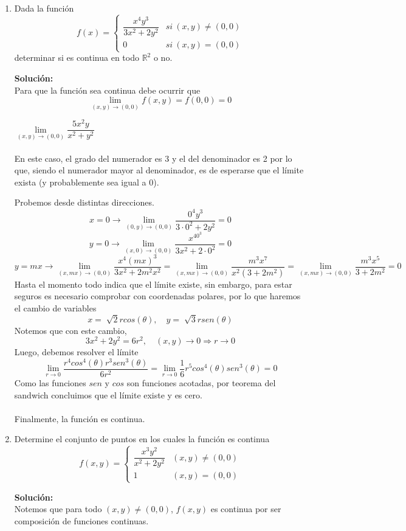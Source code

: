 \documentclass[12pt]{article}
\newenvironment{solucion}
{\begin{mdframed}[backgroundcolor=black!10]
		{\bf Solución:}\\
	}
	{
	\end{mdframed}
}
\newenvironment{preguntas}
{\begin{enumerate}\itemsep12pt
	}
	{
	\end{enumerate}
}
\newcommand{\ra}{\rightarrow}
\newcommand{\R}{\mathbb{R}}
\begin{document}
\begin{preguntas}
\begin{solucion}
\begin{enumerate}[a)]
Como conclusión, para que el límite exista, este debe ser igual para cualquier valor de $\theta$, incluso antes de evaluar el límite.
\end{enumerate}
\end{solucion}
\item Dada la función 
	$$ f(x) = 
	\begin{cases}
	\dfrac{x^4y^3}{3x^2+2y^2} & si\ (x,y) \neq (0,0) \\
	0 & si\ (x,y) = (0,0)
	\end{cases}
	$$
	determinar si es continua en todo $\R^2$ o no.
\begin{solucion}
Para que la función sea continua debe ocurrir que 
$$\lim\limits_{(x,y) \to (0,0)} f(x,y) = f(0,0) = 0$$

$\lim\limits_{(x,y) \to (0,0)} \dfrac{5x^2y}{x^2+y^2}$\\
			\\
			En este caso, el grado del numerador es 3 y el del denominador es 2 por lo que, siendo el numerador mayor al denominador, es de esperarse que el límite exista (y probablemente sea igual a 0).
			
			Probemos desde distintas direcciones.
$$x = 0 \ra \lim\limits_{(0,y) \to (0,0)} \dfrac{0^4y^3}{3\cdot0^2+2y^2} = 0$$
$$y = 0 \ra \lim\limits_{(x,0) \to (0,0)} \dfrac{x^40^3}{3x^2+2\cdot 0^2} = 0$$
$$y = mx \ra \lim\limits_{(x,mx) \to (0,0)} \dfrac{x^4 (mx)^3}{3x^2+2m^2x^2}
= \lim\limits_{(x,mx) \to (0,0)} \dfrac{m^3x^7}{x^2(3+2m^2)}
= \lim\limits_{(x,mx) \to (0,0)} \dfrac{m^3x^5}{3+2m^2} = 0$$
			Hasta el momento todo indica que el límite existe, sin embargo, para estar seguros es necesario comprobar con coordenadas polares, por lo que haremos el cambio de variables
$$x = \sqrt[]{2}rcos(\theta), \quad y = \sqrt[]{3}rsen(\theta)$$
Notemos que con este cambio,
$$3x^2+2y^2 = 6r^2, \quad (x,y)\ra 0 \Longrightarrow r \ra 0$$
Luego, debemos resolver el límite
$$\lim\limits_{r\ra 0} \dfrac{r^4cos^4(\theta)r^3sen^3(\theta)}{6r^2}
			= \lim\limits_{r\ra 0} \dfrac{1}{6}r^5cos^4(\theta)sen^3(\theta) = 0$$
			Como las funciones $sen$ y $cos$ son funciones acotadas, por teorema del sandwich concluimos que el límite existe y es cero.\\
\\
Finalmente, la función es continua.
\end{solucion}
\item Determine el conjunto de puntos en los cuales la función es continua
	$$f(x,y) = 
	\begin{cases}
	\dfrac{x^3y^2}{x^2+2y^2} & (x,y) \neq (0,0)\\
	1 & (x,y) = (0,0)
	\end{cases}
	$$
\begin{solucion}
Notemos que para todo $(x,y) \neq (0,0)$, $f(x,y)$ es continua por ser composición de funciones continuas.\\


\end{solucion}
\end{preguntas}
\end{document}
